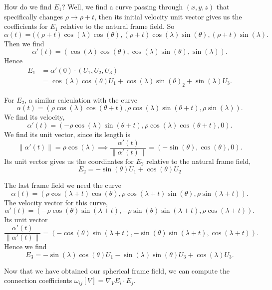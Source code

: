 \M
How do we find $E_{1}$? Well, we find a curve passing through $(x,y,z)$
that specifically changes $\rho\to\rho+t$, then its initial velocity
unit vector gives us the coefficients for $E_{1}$ relative to the
natural frame field. So
\begin{equation}
\alpha(t) = ((\rho+t)\cos(\lambda)\cos(\theta), (\rho+t)\cos(\lambda)\sin(\theta),(\rho+t)\sin(\lambda).
\end{equation}
Then we find
\begin{equation}
\alpha'(t) = (\cos(\lambda)\cos(\theta),\cos(\lambda)\sin(\theta),\sin(\lambda)).
\end{equation}
Hence
\begin{equation}
  \begin{split}
    E_{1} &= \alpha'(0)\cdot(U_{1},U_{2},U_{3})\\
    &= \cos(\lambda)\cos(\theta)U_{1} + \cos(\lambda)\sin(\theta)_{2} + \sin(\lambda)U_{3}.
  \end{split}
\end{equation}

\M
For $E_{2}$, a similar calculation with the curve
\begin{equation}
\alpha(t) = (\rho\cos(\lambda)\cos(\theta+t), \rho\cos(\lambda)\sin(\theta+t),\rho\sin(\lambda)).
\end{equation}
We find its velocity,
\begin{equation}
\alpha'(t) = (-\rho\cos(\lambda)\sin(\theta+t),\rho\cos(\lambda)\cos(\theta+t),0).
\end{equation}
We find its unit vector, since its length is
\begin{equation}
\|\alpha'(t)\| =
\rho\cos(\lambda)\implies\frac{\alpha'(t)}{\|\alpha'(t)\|} = (-\sin(\theta),\cos(\theta),0).
\end{equation}
Its unit vector gives us the coordinates for $E_{2}$ relative to the
natural frame field,
\begin{equation}
E_{2} = -\sin(\theta)U_{1} + \cos(\theta)U_{2}
\end{equation}

\M
The last frame field we need the curve
\begin{equation}
\alpha(t) = (\rho\cos(\lambda+t)\cos(\theta), \rho\cos(\lambda+t)\sin(\theta),\rho\sin(\lambda+t)).
\end{equation}
The velocity vector for this curve,
\begin{equation}
\alpha'(t) = (-\rho\cos(\theta)\sin(\lambda+t), -\rho\sin(\theta)\sin(\lambda+t),
\rho\cos(\lambda+t)).
\end{equation}
Its unit vector
\begin{equation}
\frac{\alpha'(t)}{\|\alpha'(t)\|} = (-\cos(\theta)\sin(\lambda+t), -\sin(\theta)\sin(\lambda+t),
\cos(\lambda+t)).
\end{equation}
Hence we find
\begin{equation}
E_{3} = -\sin(\lambda)\cos(\theta)U_{1} - \sin(\lambda)\sin(\theta)U_{3}+\cos(\lambda)U_{3}.
\end{equation}

Now that we have obtained our spherical frame field, we can compute the
connection coefficients $\omega_{ij}[V] = \nabla_{V}E_{i}\cdot E_{j}$.